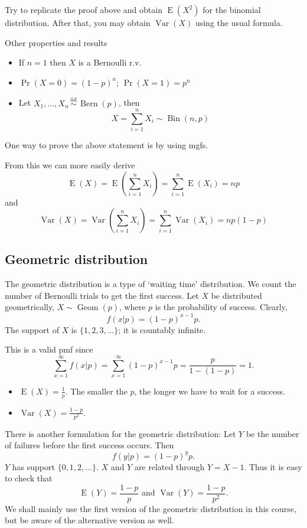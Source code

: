 \documentclass[
]{book}
\providecommand{\tightlist}{%
  \setlength{\itemsep}{0pt}\setlength{\parskip}{0pt}}
\DeclareMathOperator{\E}{E}
\DeclareMathOperator{\Var}{Var}
\DeclareMathOperator{\Bin}{Bin}
\DeclareMathOperator{\Bern}{Bern}
\DeclareMathOperator{\Geom}{Geom}
\newcommand{\iid}{\,\overset{\text{iid}}{\sim}\,}
\theoremstyle{definition}
\theoremstyle{definition}
\theoremstyle{definition}
\theoremstyle{definition}
\theoremstyle{remark}
\begin{document}
Try to replicate the proof above and obtain \(\E(X^2)\) for the binomial distribution. After that, you may obtain \(\Var(X)\) using the usual formula.

Other properties and results

\begin{itemize}
\tightlist
\item
  If \(n=1\) then \(X\) is a Bernoulli r.v.
\item
  \(\Pr(X=0)=(1-p)^n\); \(\Pr(X=1)=p^n\)
\item
  Let \(X_1,\dots,X_n\iid\Bern(p)\), then
  \[
  X = \sum_{i=1}^n X_i \sim \Bin(n,p)
  \]
\end{itemize}

One way to prove the above statement is by using mgfs.

From this we can more easily derive
\[
\E(X) = \E\left(\sum_{i=1}^n X_i \right) = \sum_{i=1}^n \E(X_i) = np
\]
and
\[
\Var(X) = \Var\left(\sum_{i=1}^n X_i \right) = \sum_{i=1}^n \Var(X_i) = np(1-p)
\]

\hypertarget{geometric-distribution}{%
\subsection{Geometric distribution}\label{geometric-distribution}}

The geometric distribution is a type of `waiting time' distribution.
We count the number of Bernoulli trials to get the first success.
Let \(X\) be distributed geometrically, \(X\sim\Geom(p)\), where \(p\) is the probability of success. Clearly,
\[
  f(x|p)=(1-p)^{x-1}p.
\]
The support of \(X\) is \(\{1,2,3,\dots\}\); it is countably infinite.

This is a valid pmf since
\[
\sum_{x=1}^\infty f(x|p) = \sum_{x=1}^\infty (1-p)^{x-1}p = \frac{p}{1-(1-p)} = 1.
\]

\begin{itemize}
\tightlist
\item
  \(\E(X)=\frac{1}{p}\). The smaller the \(p\), the longer we have to wait for a success.
\item
  \(\Var(X)=\frac{1-p}{p^2}\).
\end{itemize}

There is another formulation for the geometric distribution: Let \(Y\) be the number of failures before the first success occurs. Then
\[
f(y|p) = (1-p)^yp.
\]
\(Y\) has support \(\{0,1,2,\dots\}\). \(X\) and \(Y\) are related through \(Y=X-1\). Thus it is easy to check
that
\[
\E(Y) = \frac{1-p}{p} \text{ and } \Var(Y)=\frac{1-p}{p^2}.
\]
We shall mainly use the first version of the geometric distribution in this course, but be aware of the alternative version as well.
\end{document}
